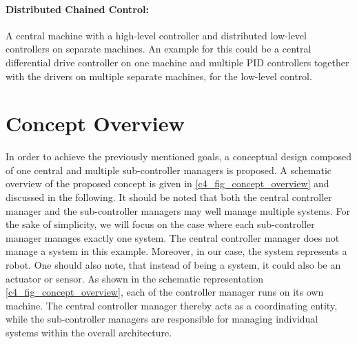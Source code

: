 \paragraph{Distributed Chained Control:}\label{c4_sec_distributed_controller_chaining}
A central machine with a high-level controller and distributed low-level controllers on separate machines. An example for this could be a central differential drive controller on one machine and multiple PID controllers together with the drivers on multiple separate machines, for the low-level control. 


\section{Concept Overview}\label{c4_sec_overview}
In order to achieve the previously mentioned goals, a conceptual design composed of one central and multiple sub-controller managers is proposed. A schematic overview of the proposed concept is given in \autoref{c4_fig_concept_overview} and discussed in the following. It should be noted that both the central controller manager and the sub-controller managers may well manage multiple systems. For the sake of simplicity, we will focus on the case where each sub-controller manager manages exactly one system. The central controller manager does not manage a system in this example. Moreover, in our case, the system represents a robot. One should also note, that instead of being a system, it could also be an actuator or sensor.\newline
As shown in the schematic representation \autoref{c4_fig_concept_overview}, each of the controller manager runs on its own machine. The central controller manager thereby acts as a coordinating entity, while the sub-controller managers are responsible for managing individual systems within the overall architecture.\newline
